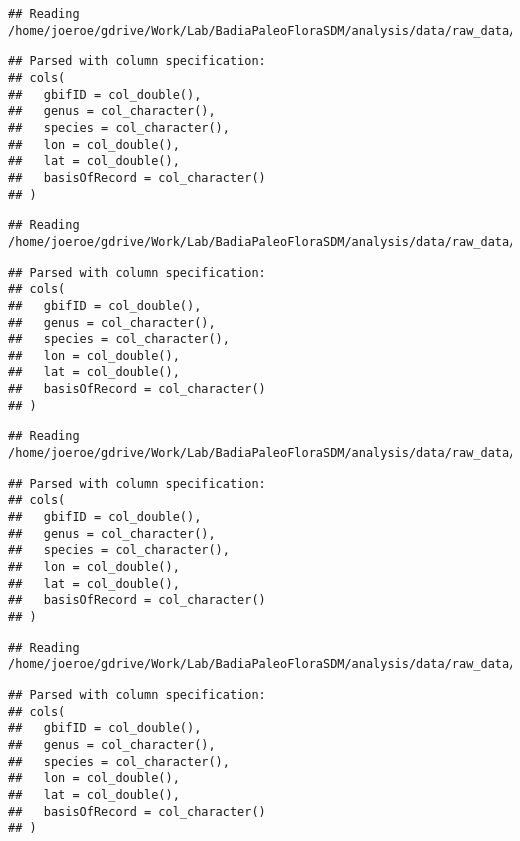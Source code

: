 \documentclass[]{article}
\begin{document}
\begin{verbatim}
## Reading /home/joeroe/gdrive/Work/Lab/BadiaPaleoFloraSDM/analysis/data/raw_data/gbif/gbif_hordeum_spontaneum.csv
\end{verbatim}

\begin{verbatim}
## Parsed with column specification:
## cols(
##   gbifID = col_double(),
##   genus = col_character(),
##   species = col_character(),
##   lon = col_double(),
##   lat = col_double(),
##   basisOfRecord = col_character()
## )
\end{verbatim}

\begin{verbatim}
## Reading /home/joeroe/gdrive/Work/Lab/BadiaPaleoFloraSDM/analysis/data/raw_data/gbif/gbif_bolboschoenus_glaucus.csv
\end{verbatim}

\begin{verbatim}
## Parsed with column specification:
## cols(
##   gbifID = col_double(),
##   genus = col_character(),
##   species = col_character(),
##   lon = col_double(),
##   lat = col_double(),
##   basisOfRecord = col_character()
## )
\end{verbatim}

\begin{verbatim}
## Reading /home/joeroe/gdrive/Work/Lab/BadiaPaleoFloraSDM/analysis/data/raw_data/gbif/gbif_bolboschoenus_maritimus.csv
\end{verbatim}

\begin{verbatim}
## Parsed with column specification:
## cols(
##   gbifID = col_double(),
##   genus = col_character(),
##   species = col_character(),
##   lon = col_double(),
##   lat = col_double(),
##   basisOfRecord = col_character()
## )
\end{verbatim}

\begin{verbatim}
## Reading /home/joeroe/gdrive/Work/Lab/BadiaPaleoFloraSDM/analysis/data/raw_data/gbif/gbif_scirpus_maritimus.csv
\end{verbatim}

\begin{verbatim}
## Parsed with column specification:
## cols(
##   gbifID = col_double(),
##   genus = col_character(),
##   species = col_character(),
##   lon = col_double(),
##   lat = col_double(),
##   basisOfRecord = col_character()
## )
\end{verbatim}
\end{document}

